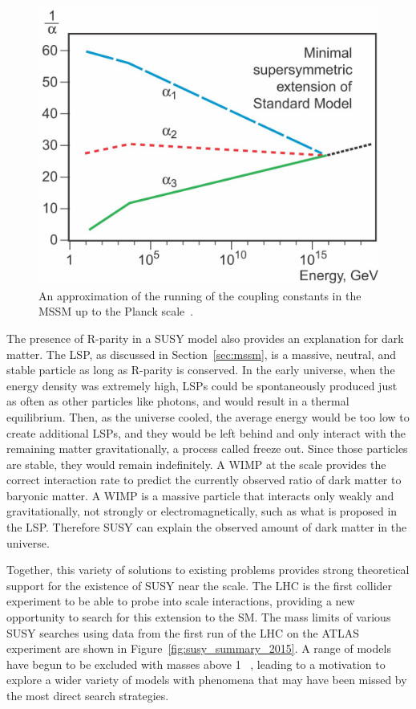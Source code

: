 \begin{figure}
\includegraphics[width=\fullfig]{figures/unification_susy.jpg}
\caption{An approximation of the running of the coupling constants in the \acs*{MSSM} up to the Planck scale~\cite{unification_plot}.}
\label{fig:unification_susy}
\end{figure}

The presence of R-parity in a \ac{SUSY} model also provides an explanation for dark matter.
The \ac{LSP}, as discussed in Section~\ref{sec:mssm}, is a massive, neutral, and stable particle as long as R-parity is conserved.
In the early universe, when the energy density was extremely high, \acp{LSP} could be spontaneously produced just as often as other particles like photons, and would result in a thermal equilibrium.
Then, as the universe cooled, the average energy would be too low to create additional \acp{LSP}, and they would be left behind and only interact with the remaining matter gravitationally, a process called freeze out.
Since those particles are stable, they would remain indefinitely. 
A \ac{WIMP} at the \TeV scale provides the correct interaction rate to predict the currently observed ratio of dark matter to baryonic matter.
A \ac{WIMP} is a massive particle that interacts only weakly and gravitationally, not strongly or electromagnetically, such as what is proposed in the \ac{LSP}. 
Therefore \ac{SUSY} can explain the observed amount of dark matter in the universe.

Together, this variety of solutions to existing problems provides strong theoretical support for the existence of \ac{SUSY} near the \TeV scale.
The \ac{LHC} is the first collider experiment to be able to probe into \TeV scale interactions, providing a new opportunity to search for this extension to the \ac{SM}.
The mass limits of various \ac{SUSY} searches using data from the first run of the \ac{LHC} on the ATLAS experiment are shown in Figure~\ref{fig:susy_summary_2015}.
A range of models have begun to be excluded with masses above 1 \TeV~\cite{pdg}, leading to a motivation to explore a wider variety of models with phenomena that may have been missed by the most direct search strategies.

